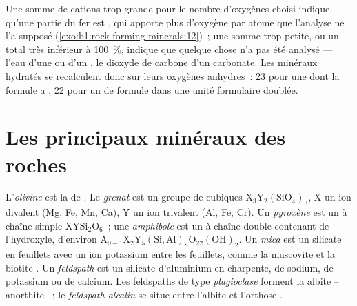 Une somme de cations trop grande pour le nombre d'oxygènes choisi indique qu'une
partie du fer est , qui apporte plus d'oxygène par atome que
l'analyse ne l'a supposé (\cref{exo:b1:rock-forming-minerals:12})~; une somme
trop petite, ou un total très inférieur à \qty{100}{\percent}, indique que
quelque chose n'a pas été analysé --- l'eau d'une  ou d'un , le
dioxyde de carbone d'un carbonate. Les minéraux hydratés se recalculent donc sur
leurs oxygènes anhydres~: 23 pour une  dont la formule a ,
22 pour un  de formule  dans une unité formulaire doublée.

\section{Les principaux minéraux des roches}

\begin{definition}\label{def:b1:rock-forming-minerals:groups}
L'\emph{olivine} est la  de 
. Le \emph{grenat} est un groupe de 
cubiques $\mathrm{X_3Y_2(SiO_4)_3}$, X un ion divalent (Mg, Fe, Mn, Ca), Y un ion
trivalent (Al, Fe, Cr). Un \emph{pyroxène} est un
 à chaîne simple $\mathrm{XYSi_2O_6}$~; une
\emph{amphibole} est un  à chaîne double contenant de
l'hydroxyle, d'environ $\mathrm{A_{0-1}X_2Y_5(Si,Al)_8O_{22}(OH)_2}$. Un
\emph{mica} est un silicate en feuillets avec un ion potassium entre
les feuillets, comme la muscovite  et la biotite
. Un \emph{feldspath} est un
silicate d'aluminium en charpente, de sodium, de potassium ou de calcium. Les
feldspaths de type \emph{plagioclase} forment la  albite  -- anorthite ~; le
\emph{feldspath alcalin} se situe entre l'albite et
l'orthose .
\end{definition}

